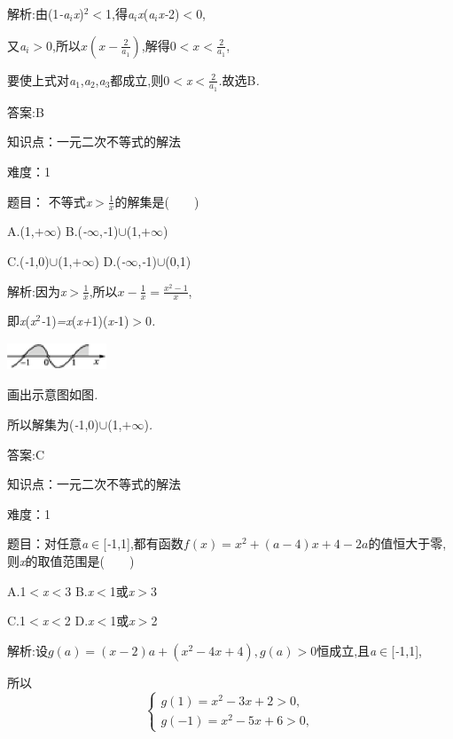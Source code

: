 \documentclass{article} %
\begin{document}
 解析:由(1\textit{-a${}_{i}$x})${}^{2}$\textit{$<$}1,得\textit{a${}_{i}$x}(\textit{a${}_{i}$x-}2)\textit{$<$}0,

又\textit{a${}_{i}$$>$}0,所以$x(x-\frac{2}{a_1})$,解得$ 0<x<\frac{2}{a_1}$,

要使上式对\textit{a}${}_{1}$,\textit{a}${}_{2}$,\textit{a}${}_{3}$都成立,则0\textit{$<$x$<\frac{2}{a_1}$}\textit{.}故选B\textit{.}

 答案:B

知识点：一元二次不等式的解法

难度：1

 题目：
不等式\textit{x$>\frac{1}{x}$}的解集是(\textit{　　})

 A.(1,\textit{$+\infty$}) B.(\textit{-$\infty$},\textit{-}1)$\mathrm{\cup}$(1,\textit{$+\infty$})

 C.(\textit{-}1,0)$\mathrm{\cup}$(1,\textit{$+\infty$}) D.(\textit{-$\infty$},\textit{-}1)$\mathrm{\cup}$(0,1)

 解析:因为\textit{x$>\frac{1}{x}$},所以$x-\frac{1}{x}=\frac{x^2-1}{x}$,

即\textit{x}(\textit{x}${}^{2}$\textit{-}1)\textit{=x}(\textit{x+}1)(\textit{x-}1)\textit{$>$}0\textit{.}

 \includegraphics*[width=1.17in, height=0.32in, keepaspectratio=false]{image1274}

画出示意图如图\textit{.}

所以解集为(\textit{-}1,0)$\mathrm{\cup}$(1,\textit{$+\infty$})\textit{.}

 答案:C

知识点：一元二次不等式的解法

难度：1

 题目：对任意\textit{a}$\mathrm{\in}$[\textit{-}1,1],都有函数$ f(x)=x^2+(a-4)x+4-2a$的值恒大于零,则\textit{x}的取值范围是(\textit{　　})

 A.1\textit{$<$x$<$}3 B.\textit{x$<$}1或\textit{x$>$}3

 C.1\textit{$<$x$<$}2 D.\textit{x$<$}1或\textit{x$>$}2

 解析:设$ g(a)=(x-2)a+(x^2-4x+4),g(a)>0$恒成立,且\textit{a}$\mathrm{\in}$[\textit{-}1,1],

所以
\[
\begin{cases}
g(1)=x^2-3x+2>0,\\
g(-1)=x^2-5x+6>0,
\end{cases}
\]
\end{document}
